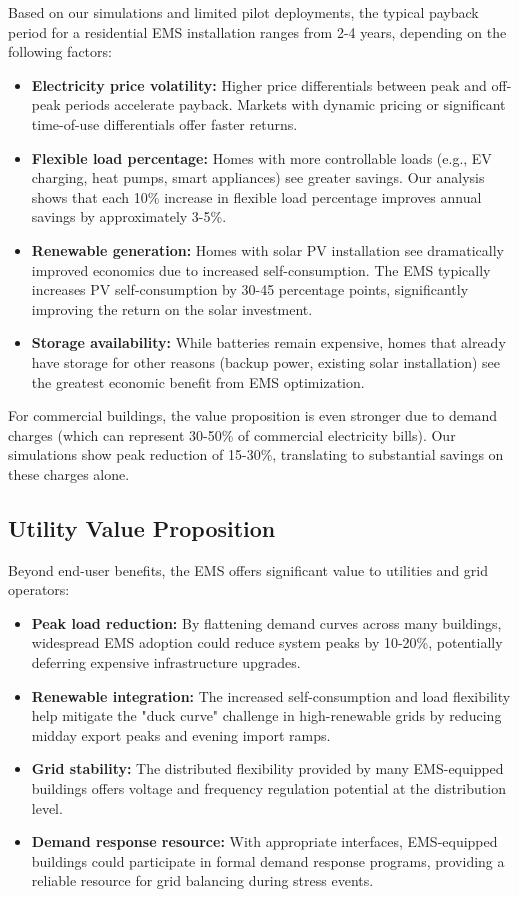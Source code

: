 \documentclass[12pt,a4paper]{article}
\begin{document}
Based on our simulations and limited pilot deployments, the typical payback period for a residential EMS installation ranges from 2-4 years, depending on the following factors:

\begin{itemize}
    \item \textbf{Electricity price volatility:} Higher price differentials between peak and off-peak periods accelerate payback. Markets with dynamic pricing or significant time-of-use differentials offer faster returns.
    \item \textbf{Flexible load percentage:} Homes with more controllable loads (e.g., EV charging, heat pumps, smart appliances) see greater savings. Our analysis shows that each 10\% increase in flexible load percentage improves annual savings by approximately 3-5\%.
    \item \textbf{Renewable generation:} Homes with solar PV installation see dramatically improved economics due to increased self-consumption. The EMS typically increases PV self-consumption by 30-45 percentage points, significantly improving the return on the solar investment.
    \item \textbf{Storage availability:} While batteries remain expensive, homes that already have storage for other reasons (backup power, existing solar installation) see the greatest economic benefit from EMS optimization.
\end{itemize}

For commercial buildings, the value proposition is even stronger due to demand charges (which can represent 30-50\% of commercial electricity bills). Our simulations show peak reduction of 15-30\%, translating to substantial savings on these charges alone.

\subsection{Utility Value Proposition}

Beyond end-user benefits, the EMS offers significant value to utilities and grid operators:

\begin{itemize}
    \item \textbf{Peak load reduction:} By flattening demand curves across many buildings, widespread EMS adoption could reduce system peaks by 10-20\%, potentially deferring expensive infrastructure upgrades.
    \item \textbf{Renewable integration:} The increased self-consumption and load flexibility help mitigate the "duck curve" challenge in high-renewable grids by reducing midday export peaks and evening import ramps.
    \item \textbf{Grid stability:} The distributed flexibility provided by many EMS-equipped buildings offers voltage and frequency regulation potential at the distribution level.
    \item \textbf{Demand response resource:} With appropriate interfaces, EMS-equipped buildings could participate in formal demand response programs, providing a reliable resource for grid balancing during stress events.
\end{itemize}
\end{document}
